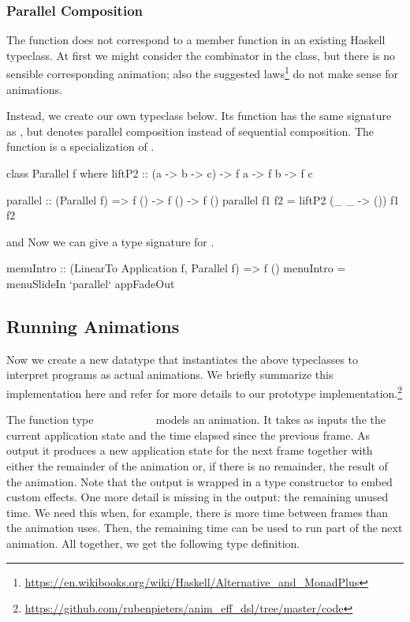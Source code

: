 \subsubsection{Parallel Composition}

The  function does not correspond to a member function in an
existing Haskell typeclass. At first we might consider the \hs{<|>} combinator
in the  class, but there is no sensible corresponding
 animation; also the suggested 
laws\footnote{\url{https://en.wikibooks.org/wiki/Haskell/Alternative_and_MonadPlus}}
do not make sense for animations.

Instead, we create our own  typeclass below. Its function
 has the same signature as , but denotes
parallel composition instead of sequential composition. The
 function is a specialization of .

\begin{code}
class Parallel f where
  liftP2 :: (a -> b -> c) -> f a -> f b -> f c

parallel :: (Parallel f) => f () -> f () -> f ()
parallel f1 f2 = liftP2 (\_ _ -> ()) f1 f2
\end{code}
 and
Now we can give a type signature for .
\begin{code}
menuIntro :: (LinearTo Application f, Parallel f) => f ()
menuIntro = menuSlideIn `parallel` appFadeOut
\end{code}

\subsection{Running Animations}

Now we create a new  datatype that instantiates the above
typeclasses to interpret \dsl{} programs as actual animations. We briefly
summarize this implementation here and refer for more details to
our prototype
implementation.\footnote{\url{https://github.com/rubenpieters/anim_eff_dsl/tree/master/code}}

The function type
~\hs{->}~~\hs{->}~~\hs{(}~~~~~
models an animation.
It takes as inputs the the current application state and the
time elapsed since the previous frame. As output it produces a new
application state for the next frame together with either the remainder of the animation or, if there is no remainder, the result of
the animation. Note that the output is wrapped in a type
constructor  to embed custom effects. 
One more detail is missing in the output: the remaining unused time. We need
this when, for example, there is more time between frames than the animation
uses.
Then, the remaining time
can be used to run part of the next animation. All together, we get
the following type definition.

